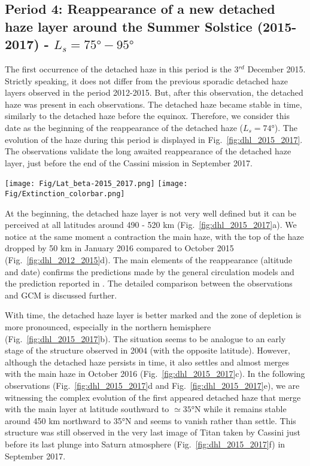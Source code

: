 \subsection{Period 4: Reappearance of a new detached haze layer around the Summer Solstice (2015-2017) - $L_s=\ang{75}-\ang{95}$}

The first occurrence of the detached haze in this period is the 3$^{rd}$ December 2015. Strictly speaking, it
does not differ from the previous sporadic detached haze layers observed in the period 2012-2015. But, after
this observation, the detached haze was present in each observations. The detached haze became stable in time,
similarly to the detached haze before the equinox. Therefore, we consider this date as the beginning of the
reappearance of the detached haze ($L_s=\ang{74}$). The evolution of the haze during this period is displayed in
Fig.~\ref{fig:dhl_2015_2017}. The observations validate the long awaited reappearance of the detached haze layer,
just before the end of the Cassini mission in September 2017.

\begin{figure*}[!ht]
    \centering
    \texttt{[image: Fig/Lat\_beta-2015\_2017.png]}
    \texttt{[image: Fig/Extinction\_colorbar.png]}\vspace{-.3cm}
    \caption{Same as the figures~\ref{fig:dhl_2004_2008}, \ref{fig:dhl_2008_2012}
    and~\ref{fig:dhl_2012_2015} for 6 images taken between 2015 and 2017
    ($L_s=\ang{75}-\ang{95}$) during the reappearance of the DHL.}
    \label{fig:dhl_2015_2017}
\end{figure*}

At the beginning, the detached haze layer is not very well defined but it can be perceived at all latitudes
around 490 - 520 km (Fig.~\ref{fig:dhl_2015_2017}a). We notice at the same moment a contraction
the main haze, with the top of the haze dropped by 50 km in January 2016 compared to October 2015
(Fig.~\ref{fig:dhl_2012_2015}d). The main elements of the reappearance (altitude and date) confirms the
predictions made by the general circulation models \citep{Lebonnois2012,Larson2015} and the prediction
reported in \cite{West2011}. The detailed comparison between the observations and GCM is discussed further.

With time, the detached haze layer is better marked and the zone of depletion is more pronounced, especially in the
northern hemisphere (Fig.~\ref{fig:dhl_2015_2017}b). The situation seems to be analogue to an early stage of
the structure observed in 2004 (with the opposite latitude). However, although the detached haze persists in time,
it also settles and almost merges with the main haze in October 2016 (Fig.~\ref{fig:dhl_2015_2017}c).
In the  following observations (Fig.~\ref{fig:dhl_2015_2017}d and Fig.~\ref{fig:dhl_2015_2017}e), we are
witnessing the complex evolution of the first appeared detached haze that merge with the main layer at latitude southward
to $\simeq \ang{35}$N while it remains stable around 450 km northward to \ang{35}N and seems to vanish rather than settle.
This structure was still observed in the very last image of Titan taken by Cassini just before its last plunge into Saturn
atmosphere (Fig.~\ref{fig:dhl_2015_2017}f) in September 2017.

